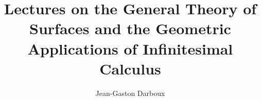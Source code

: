 \documentclass[11pt]{book}
\begin{document}
\author{Jean-Gaston Darboux}
\title{Lectures on the General Theory of Surfaces and the Geometric Applications of Infinitesimal Calculus}


\frontmatter
\tableofcontents


\mainmatter



\backmatter
\printindex
\end{document}

